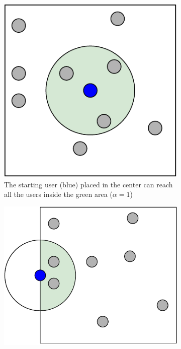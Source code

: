 \begin{figure}[hbt]
	\centering
	\begin{subfigure}{0.25\textwidth}
		\centering
		\includegraphics[width=\textwidth]{img/start-node-position-center}
		\caption{The starting user (blue) placed in the center can reach
		all the users inside the green
		area (\(\alpha = 1\))}\label{subfig:startnodecenter}
	\end{subfigure}
	\begin{subfigure}{0.35\textwidth}
		\centering
		\includegraphics[width=\textwidth]{img/start-node-position-border}

\end{subfigure}
\end{figure}

